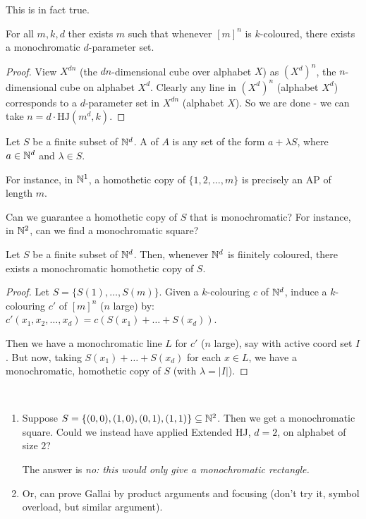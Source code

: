 \documentclass[10pt]{article}
\newcommand{\hj}{\textrm{HJ}}
\begin{document}
This is in fact true.

\begin{theorem}
    For all $m,k,d$ ther exists $m$ such that whenever $[m]^{n}$ is $k$-coloured, there exists a monochromatic $d$-parameter set.
\end{theorem}
\begin{proof}
    View $X^{dn}$ (the $dn$-dimensional cube over alphabet $X$) as $(X^d)^n$, the $n$-dimensional cube on alphabet $X^d$. Clearly any line in $(X^d)^n$ (alphabet $X^d$) corresponds to a $d$-parameter set in $X^{dn}$ (alphabet $X$). So we are done - we can take $n = d\cdot \hj(m^d,k)$.
\end{proof}

Let $S$ be a finite subset of $\mathbb{N}^d$. A  of $A$ is any set of the form $a + \lambda S$, where $a \in \mathbb{N}^d$ and $\lambda \in S$.

For instance, in $\mathbb{N}^1$, a homothetic copy of $\{1,2,\dots,m\}$ is precisely an AP of length $m$.

Can we guarantee a homothetic copy of $S$ that is monochromatic? For instance, in $\mathbb{N}^2$, can we find a monochromatic square?

\begin{theorem}
    Let $S$ be a finite subset of $\mathbb{N}^d$. Then, whenever $\mathbb{N}^d$ is fiinitely coloured, there exists a monochromatic homothetic copy of $S$.
\end{theorem}
\begin{proof}
    Let $S = \{S(1),\dots,S(m)\}$. Given a $k$-colouring $c$ of $\mathbb{N}^d$, induce a $k$-colouring $c'$ of $[m]^n$ ($n$ large) by: $c'(x_1,x_2,\dots,x_d) = c(S(x_1)+\dots + S(x_d))$.

    Then we have a monochromatic line $L$ for $c'$ ($n$ large), say with active coord set $I$. But now, taking $S(x_1)+\dots + S(x_d)$ for each $x \in L$, we have a monochromatic, homothetic copy of $S$ (with $\lambda = |I|$).
\end{proof}
\begin{remark*}[Remarks]\ 
    \begin{enumerate}
        \item Suppose $S = \{(0,0),(1,0),(0,1),(1,1)\} \subseteq \mathbb{N}^2$. Then we get a monochromatic square. Could we instead have applied Extended HJ, $d = 2$, on alphabet of size $2$?
        
        The answer is \it{no}: this would only give a monochromatic rectangle.

        \item Or, can prove Gallai by product arguments and focusing (don't try it, symbol overload, but similar argument).
    \end{enumerate}
\end{remark*}

\end{document}
